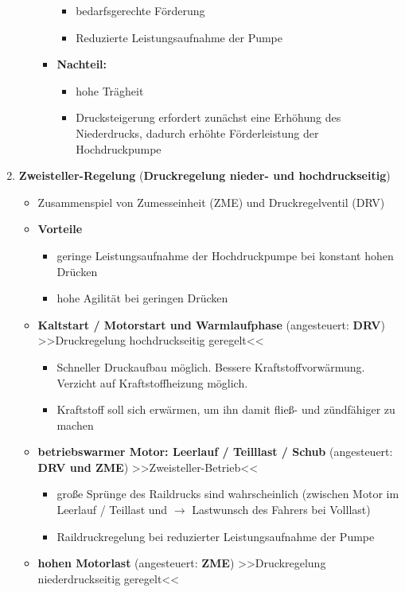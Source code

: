 \begin{enumerate}
\begin{itemize}
\begin{itemize}
      \begin{itemize}
      \item
        bedarfsgerechte Förderung
      \item
        Reduzierte Leistungsaufnahme der Pumpe
      \end{itemize}
    \item
      \textbf{Nachteil:}

      \begin{itemize}
      \item
        hohe Trägheit
      \item
        Drucksteigerung erfordert zunächst eine Erhöhung des
        Niederdrucks, dadurch erhöhte Förderleistung der Hochdruckpumpe
      \end{itemize}
    \end{itemize}
  \end{itemize}
\item
  \textbf{Zweisteller-Regelung} (\textbf{Druckregelung nieder- und
  hochdruckseitig})

  \begin{itemize}
  \item
    Zusammenspiel von Zumesseinheit (ZME) und Druckregelventil (DRV)
  \item
    \textbf{Vorteile}

    \begin{itemize}
    \item
      geringe Leistungsaufnahme der Hochdruckpumpe bei konstant hohen
      Drücken
    \item
      hohe Agilität bei geringen Drücken
    \end{itemize}
  \item
    \textbf{Kaltstart / Motorstart und Warmlaufphase} (angesteuert:
    \textbf{DRV}) >>Druckregelung hochdruckseitig geregelt<<

    \begin{itemize}
    \item
      Schneller Druckaufbau möglich. Bessere Kraftstoffvorwärmung.
      Verzicht auf Kraftstoffheizung möglich.
    \item
      Kraftstoff soll sich erwärmen, um ihn damit fließ- und zündfähiger
      zu machen
    \end{itemize}
  \item
    \textbf{betriebswarmer Motor: Leerlauf / Teilllast / Schub}
    (angesteuert: \textbf{DRV und ZME}) >>Zweisteller-Betrieb<<

    \begin{itemize}
    \item
      große Sprünge des Raildrucks sind wahrscheinlich (zwischen Motor
      im Leerlauf / Teillast und $\to$ Lastwunsch des Fahrers bei
      Volllast)
    \item
      Raildruckregelung bei reduzierter Leistungsaufnahme der Pumpe
    \end{itemize}
  \item
    \textbf{hohen Motorlast} (angesteuert: \textbf{ZME}) >>Druckregelung
    niederdruckseitig geregelt<<


\end{itemize}
\end{enumerate}
